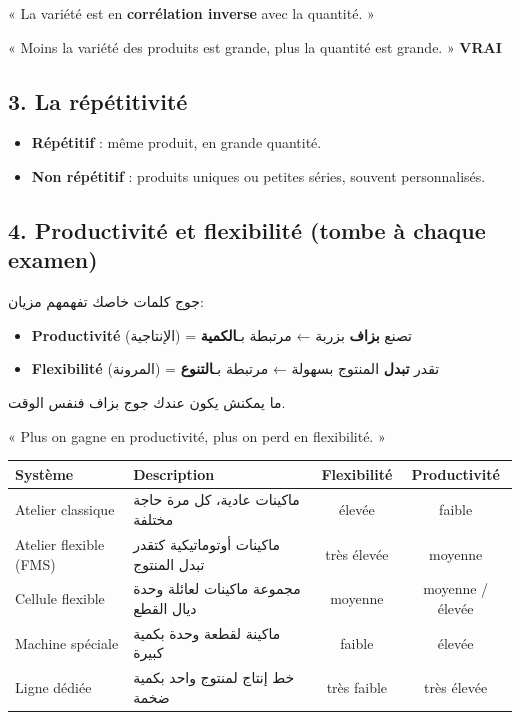 \documentclass[11pt,a4paper]{article}
\newcommand{\ar}[1]{\textarabic{#1}}
\newcommand{\vrai}{\textcolor{vert}{\textbf{VRAI}}}
\begin{document}
\begin{examen}
« La variété est en \textbf{corrélation inverse} avec la quantité. »

« Moins la variété des produits est grande, plus la quantité est grande. » \vrai
\end{examen}

\subsection*{3. La répétitivité}
\begin{itemize}
\item \textbf{Répétitif} : même produit, en grande quantité.
\item \textbf{Non répétitif} : produits uniques ou petites séries, souvent personnalisés.
\end{itemize}

\subsection*{4. Productivité et flexibilité \quad (tombe à chaque examen)}
\begin{Arabic}
جوج كلمات خاصك تفهمهم مزيان:
\begin{itemize}
\item \textbf{\textfrench{Productivité}} (الإنتاجية) = تصنع \textbf{بزاف} بزربة ← مرتبطة بـ\textbf{الكمية}
\item \textbf{\textfrench{Flexibilité}} (المرونة) = تقدر \textbf{تبدل} المنتوج بسهولة ← مرتبطة بـ\textbf{التنوع}
\end{itemize}
ما يمكنش يكون عندك جوج بزاف فنفس الوقت.
\end{Arabic}

\begin{examen}
« Plus on gagne en productivité, plus on perd en flexibilité. »
\end{examen}

\begin{center}
\begin{tabularx}{\linewidth}{l >{\raggedleft\arraybackslash}X c c}
\toprule
\textbf{Système} & \textbf{Description} & \textbf{Flexibilité} & \textbf{Productivité} \\
\midrule
Atelier classique & \ar{ماكينات عادية، كل مرة حاجة مختلفة} & élevée & faible \\
Atelier flexible (FMS) & \ar{ماكينات أوتوماتيكية كتقدر تبدل المنتوج} & très élevée & moyenne \\
Cellule flexible & \ar{مجموعة ماكينات لعائلة وحدة ديال القطع} & moyenne & moyenne / élevée \\
Machine spéciale & \ar{ماكينة لقطعة وحدة بكمية كبيرة} & faible & élevée \\
Ligne dédiée & \ar{خط إنتاج لمنتوج واحد بكمية ضخمة} & très faible & très élevée \\
\bottomrule
\end{tabularx}
\end{center}
\end{document}
